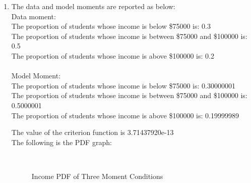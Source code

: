 \documentclass[letterpaper,12pt]{article}
\theoremstyle{definition}
\numberwithin{equation}{section}
\begin{document}
\begin{enumerate} [\bfseries (a)]
\item  The data and model moments are reported as below:\\
Data moment:\\
The proportion of students whose income is below \$75000 is: 0.3 \\
The proportion of students whose income is between \$75000 and \$100000 is: 0.5\\
The proportion of students whose income is above \$100000 is: 0.2\\
\\
Model Moment:\\
The proportion of students whose income is below \$75000 is: 0.30000001   \\
The proportion of students whose income is between \$75000 and \$100000 is: 0.5000001   \\
The proportion of students whose income is above \$100000 is: 0.19999989 \par
The value of the criterion function is 3.71437920e-13\\
The following is the PDF graph:\\
	\begin{figure}[H]
    		\centering
		\fbox{\resizebox{5in}{3in}{\texttt{[image: 1d]}}}\
    		\caption{Income PDF of Three Moment Conditions}
	\end{figure}\par


\end{enumerate}
\end{document}
